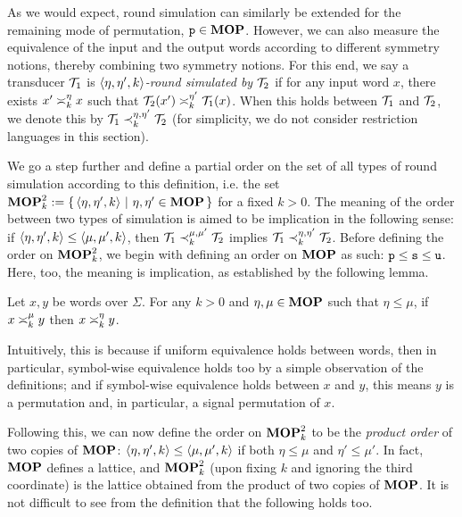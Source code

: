 As we would expect, round simulation can similarly be extended for the remaining mode of permutation, $\rstype{p}\in\RSTYPES$.
However, we can also measure the equivalence of the input and the output words according to different symmetry notions, thereby combining two symmetry notions.
For this end, we say a transducer $\cT_1$ is \emph{$\tup{\eta, \eta', k}$-round simulated by $\cT_2$} if for any input word $x$, there exists $x'\req[k]^\eta x$ such that $\cT_2(x')\req[k]^{\eta'} \cT_1(x)$. When this holds between $\cT_1$ and $\cT_2$, we denote this by $\cT_1 \prec_{k}^{\eta,\eta'} \cT_2$ (for simplicity, we do not consider restriction languages in this section).

We go a step further and define a partial order on the set of all types of round simulation according to this definition, i.e. the set $\RSTUPS:=\condset{\tup{\eta, \eta', k}}{\eta,\eta'\in \RSTYPES}$ for a fixed $k>0$. The meaning of the order between two types of simulation is aimed to be implication in the following sense:
if $\tup{\eta,\eta',k}\leq \tup{\mu,\mu',k}$, then $\cT_1 \prec_{k}^{\mu,\mu'} \cT_2$ implies $\cT_1 \prec_{k}^{\eta,\eta'} \cT_2$. Before defining the order on $\RSTUPS$, we begin with defining an order on $\RSTYPES$ as such: $\rstype{p}\leq \rstype{s}\leq \rstype{u}$. Here, too, the meaning is implication, as established by the following lemma.

\begin{lemma}
\label{lemma:partial_order_rstypes}
    Let $x,y$ be words over $\Sigma$. For any $k>0$ and $\eta,\mu\in\RSTYPES$ such that $\eta\leq \mu$, if $x\req[k]^\mu y$ then $x\req[k]^\eta y$.
\end{lemma}

Intuitively, this is because if uniform equivalence holds between words, then in particular, symbol-wise equivalence holds too by a simple observation of the definitions; and if symbol-wise equivalence holds between $x$ and $y$, this means $y$ is a permutation and, in particular, a signal permutation of $x$.

Following this, we can now define the order on $\RSTUPS$ to be the \emph{product order} of two copies of $\RSTYPES$: $\tup{\eta, \eta', k}\leq \tup{\mu, \mu', k}$ if both $\eta\leq \mu$ and $\eta'\leq \mu'$. In fact, $\RSTYPES$ defines a lattice, and $\RSTUPS$ (upon fixing $k$ and ignoring the third coordinate) is the lattice obtained from the product of two copies of $\RSTYPES$. It is not difficult to see from the definition that the following holds too.

